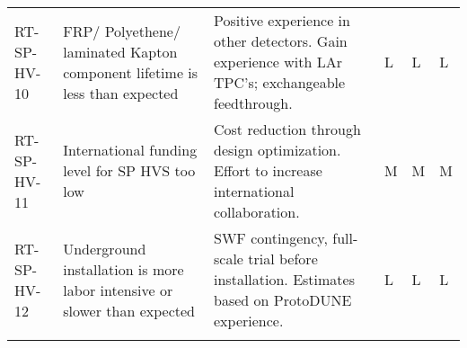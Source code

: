 \begin{footnotesize}
\begin{longtable}{P{0.18\textwidth}P{0.20\textwidth}P{0.32\textwidth}P{0.02\textwidth}P{0.02\textwidth}P{0.02\textwidth}}
RT-SP-HV-10 & FRP/ Polyethene/ laminated Kapton component lifetime is less than expected & Positive experience in other detectors. Gain experience with LAr TPC's; exchangeable feedthrough. & L & L & L \\  \colhline
RT-SP-HV-11 & International funding level for SP HVS too low & Cost reduction through design optimization. Effort to increase international collaboration. & M & M & M \\  \colhline
RT-SP-HV-12 & Underground installation is more labor intensive or slower than expected & SWF contingency, full-scale trial before installation. Estimates based on ProtoDUNE experience. & L & L & L \\  \colhline

\label{tab:risks:SP-FD-HV}
\end{longtable}
\end{footnotesize}
